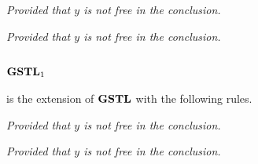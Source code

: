\documentclass[a4paper, 12pt]{paper}
\begin{document}
\begin{multicols}{2}
  \begin{prooftree}
  \end{prooftree}
  \columnbreak
  \begin{prooftree}
  \end{prooftree}
  \center
  \emph{Provided that $y$ is not free in the conclusion.}
\end{multicols}\vspace*{1em}
\begin{multicols}{2}
  \begin{prooftree}
  \end{prooftree}
  \center
  \emph{Provided that $y$ is not free in the conclusion.}
  \columnbreak
  \begin{prooftree}
  \end{prooftree}
\end{multicols}

\subsection{$\gstl_1$} is the extension of $\gstl$ with the following rules.

\begin{multicols}{2}
  \begin{prooftree}
  \end{prooftree}
  \columnbreak
  \begin{prooftree}
  \end{prooftree}
  \center
  \emph{Provided that $y$ is not free in the conclusion.}
\end{multicols}\vspace*{1em}
\begin{multicols}{2}
  \begin{prooftree}
  \end{prooftree}
  \center
  \emph{Provided that $y$ is not free in the conclusion.}
  \columnbreak
  \begin{prooftree}
  \end{prooftree}
\end{multicols}
\end{document}
